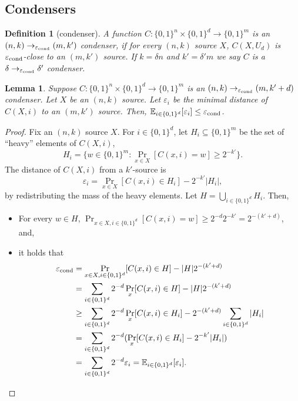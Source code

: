 \documentclass[10pt,a4paper]{article}
\newtheorem{definition}[theorem]{Definition}
\newtheorem{lemma}[theorem]{Lemma}
\newcommand{\E}{\mathbb E}
\begin{document}
\subsection*{Condensers}
\begin{definition}[condenser]
A function $C:\{0,1\}^n\times\{0,1\}^d\to\{0,1\}^m$ is an $(n,k)\to_{\varepsilon_{\rm cond}}(m,k')$ condenser, if for every $(n,k)$ source $X$, $C(X,U_d)$ is $\varepsilon_{\rm cond}$-close to an $(m,k')$ source. If $k=\delta n$ and $k'=\delta'm$ we say $C$ is a $\delta\to_{\varepsilon_{\rm cond}}\delta'$ condenser.
\end{definition}
\begin{lemma}
Suppose $C:\{0,1\}^n\times\{0,1\}^d\to\{0,1\}^m$ is an $(n,k)\to_{\varepsilon_{\rm cond}}(m,k'+d)$ condenser. Let $X$ be an $(n,k)$ source. Let $\varepsilon_i$ be the minimal distance of $C(X,i)$ to an $(m,k')$ source. Then, $\E_{i\in\{0,1\}^d}[\varepsilon_i]\le\varepsilon_{\rm cond}$.
\end{lemma}
\begin{proof}
Fix an $(n,k)$ source $X$. For $i\in\{0,1\}^d$, let $H_i\subseteq\{0,1\}^m$ be the set of ``heavy'' elements of $C(X,i)$,
\[H_i=\{w\in\{0,1\}^m:\Pr_{x\in X}[C(x,i)=w]\ge2^{-k'}\}.\]
The distance of $C(X,i)$ from a $k'$-source is
\[\varepsilon_i=\Pr_{x\in X}[C(x,i)\in H_i]-2^{-k'}|H_i|,\]
by redistributing the mass of the heavy elements. Let $H=\bigcup_{i\in\{0,1\}^d}H_i$. Then,
\begin{itemize}
\item For every $w\in H$, $\Pr_{x\in X,i\in\{0,1\}^d}[C(x,i)=w]\ge2^{-d}2^{-k'}=2^{-(k'+d)}$, and,
\item it holds that
\begin{align*}
\varepsilon_{\rm cond}&=\Pr_{x\in X,i\in\{0,1\}^d}[C(x,i)\in H]-|H|2^{-(k'+d)}\\
&=\sum_{i\in\{0,1\}^d}2^{-d}\Pr_x[C(x,i)\in H]-|H|2^{-(k'+d)}\\
&\ge\sum_{i\in\{0,1\}^d}2^{-d}\Pr_x[C(x,i)\in H_i]-2^{-(k'+d)}\sum_{i\in\{0,1\}^d}|H_i|\\
&=\sum_{i\in\{0,1\}^d}2^{-d}(\Pr_x[C(x,i)\in H_i]-2^{-k'}|H_i|)\\
&=\sum_{i\in\{0,1\}^d}2^{-d}\varepsilon_i=\E_{i\in\{0,1\}^d}[\varepsilon_i].
\end{align*}
\end{itemize}
\end{proof}
\end{document}
